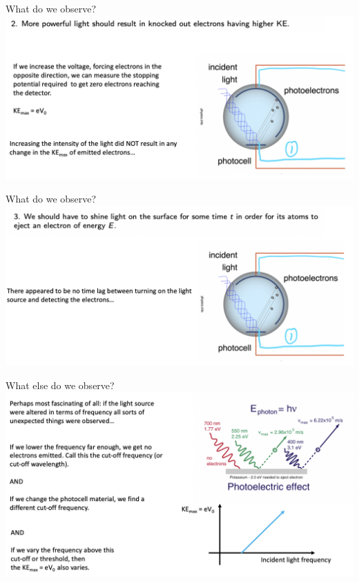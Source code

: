  
 \begin{frame}{What do we observe?}
\small
\includegraphics[scale=0.4]{observe2}
\end{frame}

\begin{frame}{What do we observe?}
\small
\includegraphics[scale=0.4]{observe3}
\end{frame}


\begin{frame}{What else do we observe?}
\small
\includegraphics[scale=0.4]{observe4}
\end{frame}



